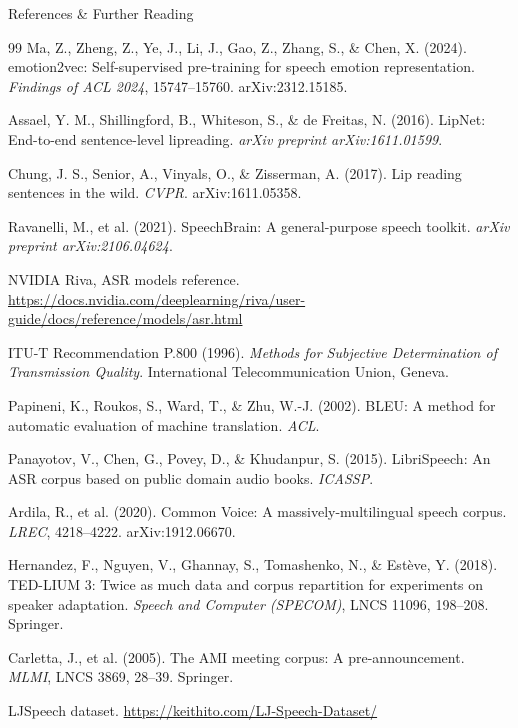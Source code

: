 \begin{frame}[allowframebreaks]{References \& Further Reading}
\begin{thebibliography}{99}
Ma, Z., Zheng, Z., Ye, J., Li, J., Gao, Z., Zhang, S., \& Chen, X. (2024). emotion2vec: Self-supervised pre-training for speech emotion representation. \textit{Findings of ACL 2024}, 15747--15760. arXiv:2312.15185.

Assael, Y. M., Shillingford, B., Whiteson, S., \& de Freitas, N. (2016). LipNet: End-to-end sentence-level lipreading. \textit{arXiv preprint arXiv:1611.01599}.

Chung, J. S., Senior, A., Vinyals, O., \& Zisserman, A. (2017). Lip reading sentences in the wild. \textit{CVPR}. arXiv:1611.05358.

Ravanelli, M., et al. (2021). SpeechBrain: A general-purpose speech toolkit. \textit{arXiv preprint arXiv:2106.04624}.

NVIDIA Riva, ASR models reference. \url{https://docs.nvidia.com/deeplearning/riva/user-guide/docs/reference/models/asr.html}

ITU-T Recommendation P.800 (1996). \textit{Methods for Subjective Determination of Transmission Quality}. International Telecommunication Union, Geneva.

Papineni, K., Roukos, S., Ward, T., \& Zhu, W.-J. (2002). BLEU: A method for automatic evaluation of machine translation. \textit{ACL}.

Panayotov, V., Chen, G., Povey, D., \& Khudanpur, S. (2015). LibriSpeech: An ASR corpus based on public domain audio books. \textit{ICASSP}.

Ardila, R., et al. (2020). Common Voice: A massively-multilingual speech corpus. \textit{LREC}, 4218--4222. arXiv:1912.06670.

Hernandez, F., Nguyen, V., Ghannay, S., Tomashenko, N., \& Estève, Y. (2018). TED-LIUM 3: Twice as much data and corpus repartition for experiments on speaker adaptation. \textit{Speech and Computer (SPECOM)}, LNCS 11096, 198--208. Springer.

Carletta, J., et al. (2005). The AMI meeting corpus: A pre-announcement. \textit{MLMI}, LNCS 3869, 28--39. Springer.

LJSpeech dataset. \url{https://keithito.com/LJ-Speech-Dataset/}


\end{thebibliography}
\end{frame}
